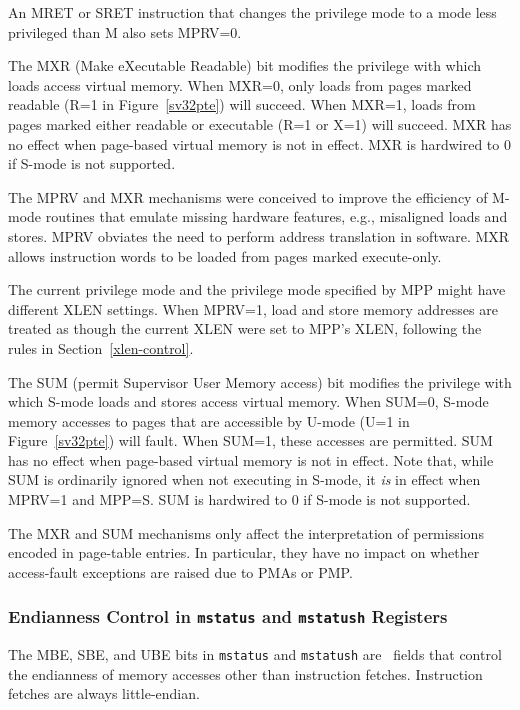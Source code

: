 An MRET or SRET instruction that changes the privilege mode to a mode
less privileged than M also sets MPRV=0.

The MXR (Make eXecutable Readable) bit modifies the privilege with which loads
access virtual memory.  When MXR=0, only loads from pages marked readable (R=1
in Figure~\ref{sv32pte}) will succeed.  When MXR=1, loads from pages marked
either readable or executable (R=1 or X=1) will succeed.  MXR has no effect
when page-based virtual memory is not in effect.  MXR is hardwired to 0 if
S-mode is not supported.

\begin{commentary}
The MPRV and MXR mechanisms were conceived to improve the efficiency of M-mode
routines that emulate missing hardware features, e.g., misaligned loads and
stores.  MPRV obviates the need to perform address translation in software.
MXR allows instruction words to be loaded from pages marked execute-only.

The current privilege mode and the privilege mode specified by MPP might have
different XLEN settings.  When MPRV=1, load and store memory addresses are
treated as though the current XLEN were set to MPP's XLEN, following the rules
in Section~\ref{xlen-control}.
\end{commentary}

The SUM (permit Supervisor User Memory access) bit modifies the privilege with
which S-mode loads and stores access virtual memory.
When SUM=0, S-mode memory accesses to pages that are accessible by U-mode (U=1
in Figure~\ref{sv32pte}) will fault.  When SUM=1, these accesses are
permitted.  SUM has no effect when page-based virtual memory is not in effect.
Note that, while SUM is ordinarily ignored when not executing in S-mode, it
{\em is} in effect when MPRV=1 and MPP=S.  SUM is hardwired to 0 if S-mode is
not supported.

\begin{commentary}
The MXR and SUM mechanisms only affect the interpretation of permissions
encoded in page-table entries.  In particular, they have no impact on whether
access-fault exceptions are raised due to PMAs or PMP.
\end{commentary}

\subsubsection{Endianness Control in {\tt mstatus} and {\tt mstatush} Registers}

The MBE, SBE, and UBE bits in {\tt mstatus} and {\tt mstatush} are
\warl\ fields that control the endianness of memory accesses other than
instruction fetches.
Instruction fetches are always little-endian.

